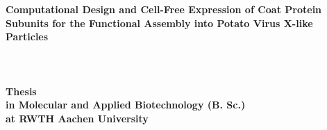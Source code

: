 \documentclass[12pt]{article}
\theoremstyle{definition}
\begin{document}



\begin{titlepage}
    \begin{figure}[t]
        
    \end{figure}
   \begin{center}
        \vspace*{1cm}
       \textbf{\huge Computational Design and Cell-Free Expression of Coat Protein Subunits for the Functional Assembly into Potato Virus X-like Particles}
       \paragraph{}$~~$\\
       \paragraph{}$~~$\\
       \paragraph{}$~~$\\
       \textbf{Thesis} \\ 
       \textbf{in Molecular and Applied Biotechnology (B. Sc.)} \\ 
       \textbf{at RWTH Aachen University}
       \paragraph{}$~~$\\
       \paragraph{}$~~$\\
       \paragraph{}$~~$\\
        \\
        \\
        \\
        \\
       \paragraph{}$~~$\\
            
   \end{center}
\end{titlepage}
\end{document}
